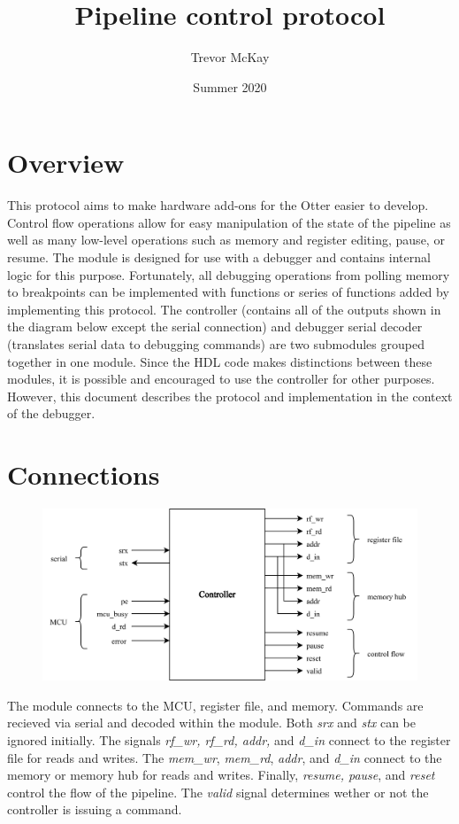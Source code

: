 \documentclass[10pt,a4paper]{article}
\title{Pipeline control protocol}
\author{Trevor McKay}
\date{Summer 2020}
\begin{document}
\maketitle

\section{Overview}

This protocol aims to make hardware add-ons for the Otter easier to develop. Control flow operations
allow for easy manipulation of the state of the pipeline as well as many low-level operations such
as memory and register editing, pause, or resume. The module is designed for use with a debugger and
contains internal logic for this purpose. Fortunately, all debugging operations from polling memory
to breakpoints can be implemented with functions or series of functions added by implementing this
protocol. The controller (contains all of the outputs shown in the diagram below except the serial
connection) and debugger serial decoder (translates serial data to debugging commands) are two
submodules grouped together in one module. Since the HDL code makes distinctions between these modules,
it is possible and encouraged to use the controller for other purposes. However, this document
describes the protocol and implementation in the context of the debugger.

\section{Connections}

\begin{figure}[H]
    \includegraphics[width=\textwidth]{pipeline_db}
\end{figure}
\medskip

The module connects to the MCU, register file, and memory. Commands are recieved via serial and
decoded within the module. Both \emph{srx} and \emph{stx} can be ignored initially. The signals \emph{rf\_wr, rf\_rd, addr,} and
\emph{d\_in} connect to the register file for reads and writes. The \emph{mem\_wr}, \emph{mem\_rd},
\emph{addr}, and \emph{d\_in} connect to the memory or memory hub for reads and writes. Finally,
\emph{resume, pause}, and \emph{reset} control the flow of the pipeline. The \emph{valid} signal
determines wether or not the controller is issuing a command.
\end{document}
